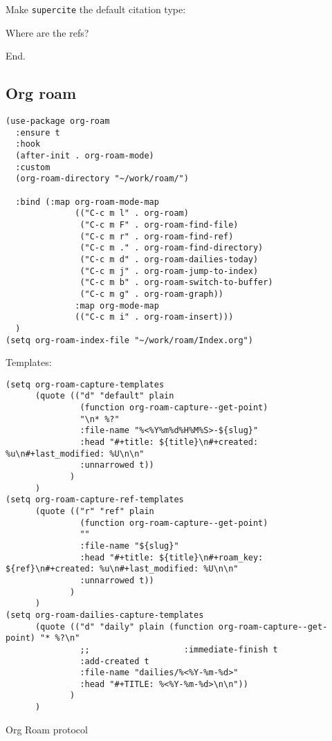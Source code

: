 \documentclass[12pt]{article}
\begin{document}
Make \texttt{supercite} the default citation type:

Where are the refs?

End.

\subsection{Org roam}
\label{sec:org827a861}
\begin{verbatim}
(use-package org-roam
  :ensure t
  :hook
  (after-init . org-roam-mode)
  :custom
  (org-roam-directory "~/work/roam/")

  :bind (:map org-roam-mode-map
              (("C-c m l" . org-roam)
               ("C-c m F" . org-roam-find-file)
               ("C-c m r" . org-roam-find-ref)
               ("C-c m ." . org-roam-find-directory)
               ("C-c m d" . org-roam-dailies-today)
               ("C-c m j" . org-roam-jump-to-index)
               ("C-c m b" . org-roam-switch-to-buffer)
               ("C-c m g" . org-roam-graph))
              :map org-mode-map
              (("C-c m i" . org-roam-insert)))
  )
(setq org-roam-index-file "~/work/roam/Index.org")
\end{verbatim}

Templates:

\begin{verbatim}
(setq org-roam-capture-templates
      (quote (("d" "default" plain
               (function org-roam-capture--get-point)
               "\n* %?"
               :file-name "%<%Y%m%d%H%M%S>-${slug}"
               :head "#+title: ${title}\n#+created: %u\n#+last_modified: %U\n\n"
               :unnarrowed t))
             )
      )
(setq org-roam-capture-ref-templates
      (quote (("r" "ref" plain
               (function org-roam-capture--get-point)
               ""
               :file-name "${slug}"
               :head "#+title: ${title}\n#+roam_key: ${ref}\n#+created: %u\n#+last_modified: %U\n\n"
               :unnarrowed t))
             )
      )
(setq org-roam-dailies-capture-templates
      (quote (("d" "daily" plain (function org-roam-capture--get-point) "* %?\n"
               ;;                   :immediate-finish t
               :add-created t
               :file-name "dailies/%<%Y-%m-%d>"
               :head "#+TITLE: %<%Y-%m-%d>\n\n"))
             )
      )
\end{verbatim}

Org Roam protocol
\end{document}

